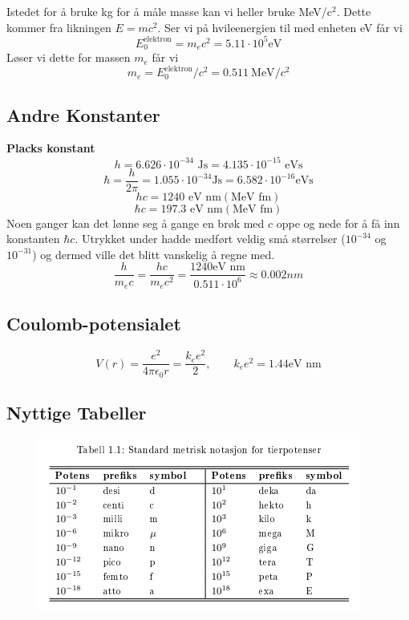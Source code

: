 Istedet for å bruke kg for å måle masse kan vi heller bruke MeV/c$^{2}$. Dette kommer fra likningen $ E = mc^{2} $. Ser vi på hvileenergien til med enheten eV får vi 
\[
E_{0}^{\text{elektron}} = m_{e} c^{2} = 5.11 \cdot 10^{5} \text{eV}
\]
Løser vi dette for massen $ m_{e} $ får vi
\[
m_e = E_{0}^{\text{elektron}} / c^{2} = 0.511\ \text{MeV}/c^{2}
\]

\subsection{Andre Konstanter}
\textbf{Placks konstant}
\[
h = 6.626 ⋅  10^{-34} \text{ Js} = 4.135 ⋅ 10^{-15} \text{  eVs}
\]
\[
ℏ = \frac{h}{2 \pi} = 1.055 ⋅ 10^{-34} \text{Js} = 6.582 ⋅ 10^{-16} \text{eVs} 
\]
\[
hc = 1240 \text{ eV nm} (\text{MeV fm})
\]
\[
ℏc = 197.3 \text{ eV nm} (\text{MeV fm})
\]
Noen ganger kan det lønne seg å gange en brøk med $ c $ oppe og nede for å få inn konstanten $ ℏc $. Utrykket under hadde medført veldig små størrelser ($ 10^{-34} $ og $ 10^{-31} $) og dermed ville det blitt vanskelig å regne med. 
\[
\frac{h}{m_e c} = \frac{hc}{m_e c^{2}} = \frac{1240 \text{eV nm}}{0.511 ⋅ 10^{6}} ≈ 0.002 nm
\]
\subsection{Coulomb-potensialet}
\[
V(r) = \frac{e^{2}}{4 \pi \epsilon_{0} r} = \frac{k_e e^{2}}{2}, \qquad k_e e^{2} = 1.44 \text{eV nm}
\]
\subsection{Nyttige Tabeller}

\begin{figure}[ht!]
  \centering
  \includegraphics[scale = 1]{Figures/Metric power notation .png}
  \caption{}
  \label{fig: Metric power notation}
\end{figure}

